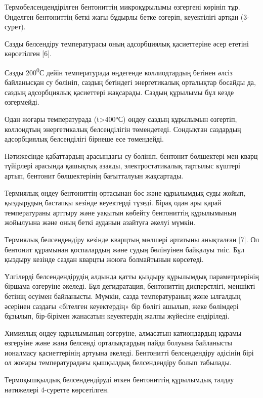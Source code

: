 \begin{multicols}{2}
Термобелсендендірілген бентониттің микроқұрылымы өзгергені көрініп тұр.
Өңделген бентониттің беткі жағы бұдырлы бетке өзгеріп, кеуектілігі
артқан (3-сурет).

Сазды белсендіру температурасы оның адсорбциялық қасиеттеріне әсер
ететіні көрсетілген {[}6{]}.

Сазды 200\textsuperscript{0}С дейін температурада өңдегенде
коллиодтардың бетінен әлсіз байланысқан су бөлініп, саздың бетіндегі
энергетикалық орталықтар босайды да, саздың адсорбциялық қасиеттері
жақсарады. Саздың құрылымы бұл кезде өзгермейді.

Одан жоғары температурада (t\textgreater400°С) өңдеу саздың құрылымын
өзгертіп, коллоидтың энергетикалық белсенділігін төмендетеді. Сондықтан
саздардың адсорбциялық белсенділігі бірнеше есе төмендейді.

Нәтижесінде қабаттардың арасындағы су бөлініп, бентонит бөлшектері мен
кварц түйірлері арасында қашықтық азаяды, электростатикалық тартылыс
күштері артып, бентонит бөлшектерінің бағытталуын жақсартады.

Термиялық өңдеу бентониттің ортасынан бос және құрылымдық суды жойып,
қыздырудың бастапқы кезінде кеуектерді түзеді. Бірақ одан ары қарай
температураны арттыру және уақытын көбейту бентониттің құрылымының
жойылуына және оның беткі ауданын азайтуға әкелуі мүмкін.

Термиялық белсендендіру кезінде кварцтың мөлшері артатыны анықталған
{[}7{]}. Ол бентонит құрамынан қоспалардың және судың бөлінуінен
байқалуы тиіс. Бұл қыздыру кезінде саздан кварцты жоюға болмайтынын
көрсетеді.

Үлгілерді белсендендірудің алдында қатты қыздыру құрылымдық
параметрлерінің біршама өзгеруіне әкеледі. Бұл дегидратация, бентониттің
дисперстлігі, меншікті бетінің өсуімен байланысты. Мүмкін, сазда
температураның және ылғалдың әсерінен саздағы «бітелген кеуектердің» бір
бөлігі ашылып, жеке бөлімдері бұзылып, бір-бірімен жанасатын кеуектердің
жалпы жүйесіне ендіріледі.

Химиялық өңдеу құрылымының өзгеруіне, алмасатын катиондардың құрамы
өзгеруіне және жаңа белсенді орталықтардың пайда болуына байланысты
ионалмасу қасиеттерінің артуына әкеледі. Бентонитті белсендендіру
әдісінің бірі ол жоғары температурадағы қышқылдық белсендендіру болып
табылады.

Термоқышқылдық белсендендіруді өткен бентониттің құрылымдық талдау
нәтижелері 4-суретте көрсетілген.
\end{multicols}

